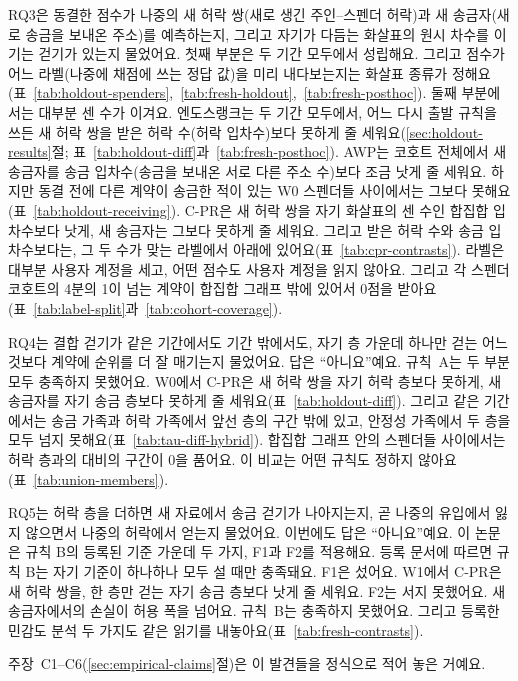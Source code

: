 RQ3은 동결한 점수가 나중의 새 허락 쌍(새로 생긴 주인–스펜더 허락)과 새 송금자(새로 송금을 보내온 주소)를 예측하는지, 그리고 자기가 다듬는 화살표의 원시 차수를 이기는 걷기가 있는지 물었어요. 첫째 부분은 두 기간 모두에서 성립해요. 그리고 점수가 어느 라벨(나중에 채점에 쓰는 정답 값)을 미리 내다보는지는 화살표 종류가 정해요(표~\ref{tab:holdout-spenders},~\ref{tab:fresh-holdout},~\ref{tab:fresh-posthoc}). 둘째 부분에서는 대부분 센 수가 이겨요. 엔도스랭크는 두 기간 모두에서, 어느 다시 출발 규칙을 쓰든 새 허락 쌍을 받은 허락 수(허락 입차수)보다 못하게 줄 세워요(\ref{sec:holdout-results}절; 표~\ref{tab:holdout-diff}과~\ref{tab:fresh-posthoc}). AWP는 코호트 전체에서 새 송금자를 송금 입차수(송금을 보내온 서로 다른 주소 수)보다 조금 낫게 줄 세워요. 하지만 동결 전에 다른 계약이 송금한 적이 있는 W0 스펜더들 사이에서는 그보다 못해요(표~\ref{tab:holdout-receiving}). \mbox{C-PR}은 새 허락 쌍을 자기 화살표의 센 수인 합집합 입차수보다 낫게, 새 송금자는 그보다 못하게 줄 세워요. 그리고 받은 허락 수와 송금 입차수보다는, 그 두 수가 맞는 라벨에서 아래에 있어요(표~\ref{tab:cpr-contrasts}). 라벨은 대부분 사용자 계정을 세고, 어떤 점수도 사용자 계정을 읽지 않아요. 그리고 각 스펜더 코호트의 4분의 1이 넘는 계약이 합집합 그래프 밖에 있어서 0점을 받아요(표~\ref{tab:label-split}과~\ref{tab:cohort-coverage}).

RQ4는 결합 걷기가 같은 기간에서도 기간 밖에서도, 자기 층 가운데 하나만 걷는 어느 것보다 계약에 순위를 더 잘 매기는지 물었어요. 답은 “아니요”예요. 규칙~A는 두 부분 모두 충족하지 못했어요. W0에서 \mbox{C-PR}은 새 허락 쌍을 자기 허락 층보다 못하게, 새 송금자를 자기 송금 층보다 못하게 줄 세워요(표~\ref{tab:holdout-diff}). 그리고 같은 기간에서는 송금 가족과 허락 가족에서 앞선 층의 구간 밖에 있고, 안정성 가족에서 두 층을 모두 넘지 못해요(표~\ref{tab:tau-diff-hybrid}). 합집합 그래프 안의 스펜더들 사이에서는 허락 층과의 대비의 구간이 0을 품어요. 이 비교는 어떤 규칙도 정하지 않아요(표~\ref{tab:union-members}).

RQ5는 허락 층을 더하면 새 자료에서 송금 걷기가 나아지는지, 곧 나중의 유입에서 잃지 않으면서 나중의 허락에서 얻는지 물었어요. 이번에도 답은 “아니요”예요. 이 논문은 규칙 B의 등록된 기준 가운데 두 가지, F1과 F2를 적용해요. 등록 문서에 따르면 규칙 B는 자기 기준이 하나하나 모두 설 때만 충족돼요. F1은 섰어요. W1에서 \mbox{C-PR}은 새 허락 쌍을, 한 층만 걷는 자기 송금 층보다 낫게 줄 세워요. F2는 서지 못했어요. 새 송금자에서의 손실이 허용 폭을 넘어요. 규칙~B는 충족하지 못했어요. 그리고 등록한 민감도 분석 두 가지도 같은 읽기를 내놓아요(표~\ref{tab:fresh-contrasts}).

주장~C1--C6(\ref{sec:empirical-claims}절)은 이 발견들을 정식으로 적어 놓은 거예요.

